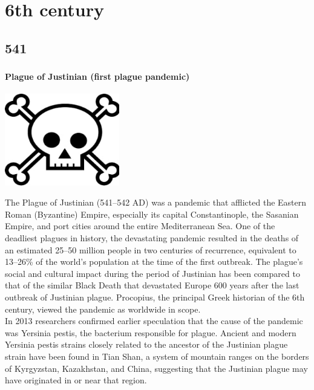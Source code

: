 \documentclass[11pt]{report}
\begin{document}

\part{6th century}
\chapter{541}
\section{}
\subsection{Plague of Justinian (first plague pandemic)}
\vspace{2mm}\begin{center}\includegraphics[width=5cm]{./img/skull.jpg}\end{center}
The Plague of Justinian (541–542 AD) was a pandemic that afflicted the Eastern Roman (Byzantine) Empire, especially its capital Constantinople, the Sasanian Empire, and port cities around the entire Mediterranean Sea. One of the deadliest plagues in history, the devastating pandemic resulted in the deaths of an estimated 25–50 million people in two centuries of recurrence, equivalent to 13–26\% of the world's population at the time of the first outbreak. The plague's social and cultural impact during the period of Justinian has been compared to that of the similar Black Death that devastated Europe 600 years after the last outbreak of Justinian plague. Procopius, the principal Greek historian of the 6th century, viewed the pandemic as worldwide in scope.\\
In 2013 researchers confirmed earlier speculation that the cause of the pandemic was Yersinia pestis, the bacterium responsible for plague. Ancient and modern Yersinia pestis strains closely related to the ancestor of the Justinian plague strain have been found in Tian Shan, a system of mountain ranges on the borders of Kyrgyzstan, Kazakhstan, and China, suggesting that the Justinian plague may have originated in or near that region.
\end{document}
